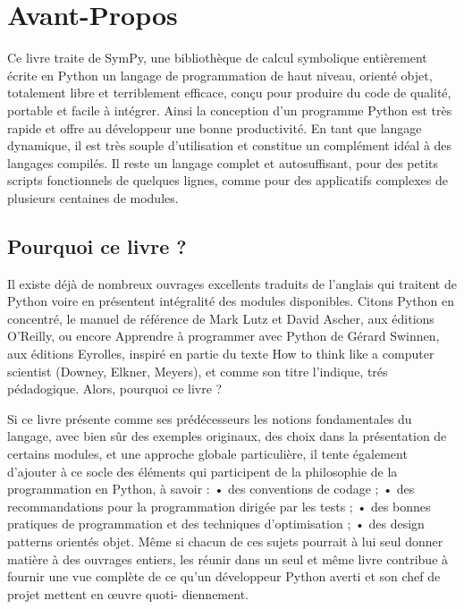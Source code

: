 \section{Avant-Propos}
Ce livre traite de SymPy, une bibliothèque de calcul symbolique entièrement écrite en Python un langage de 
programmation de haut niveau, orienté objet, totalement libre et terriblement efficace, conçu pour produire 
du code de qualité, portable et facile à intégrer. Ainsi la conception d'un programme Python est très 
rapide et offre au développeur une bonne productivité. En tant que langage dynamique, il est
très souple d'utilisation et constitue un complément idéal à des langages compilés.
Il reste un langage complet et autosuffisant, pour des petits scripts fonctionnels de 
quelques lignes, comme pour des applicatifs complexes de plusieurs centaines de modules.

\subsection*{Pourquoi ce livre ?}
Il existe déjà de nombreux ouvrages excellents traduits de l'anglais qui traitent de
Python voire en présentent intégralité des modules disponibles. Citons Python en
concentré, le manuel de référence de Mark Lutz et David Ascher, aux éditions
O'Reilly, ou encore Apprendre à programmer avec Python de Gérard Swinnen, aux
éditions Eyrolles, inspiré en partie du texte How to think like a computer scientist
(Downey, Elkner, Meyers), et comme son titre l'indique, tr\'es p\'edadogique.
Alors, pourquoi ce livre ?

Si ce livre présente comme ses prédécesseurs les notions fondamentales du langage, avec
bien sûr des exemples originaux, des choix dans la présentation de certains modules, et
une approche globale particulière, il tente également d’ajouter à ce socle des éléments
qui participent de la philosophie de la programmation en Python, à savoir :
• des conventions de codage ;
• des recommandations pour la programmation dirigée par les tests ;
• des bonnes pratiques de programmation et des techniques d’optimisation ;
• des design patterns orientés objet.
Même si chacun de ces sujets pourrait à lui seul donner matière à des ouvrages
entiers, les réunir dans un seul et même livre contribue à fournir une vue complète de
ce qu’un développeur Python averti et son chef de projet mettent en œuvre quoti-
diennement.

